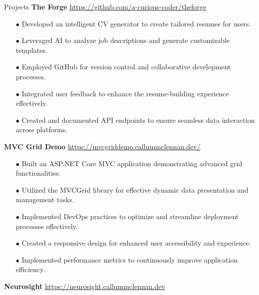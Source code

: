 \begin{rSection}{Projects}
\vspace{0.12cm}
{\bf The Forge}
\hspace{2 cm}{Python, AI, GitHub}
\hfill{\href{https://github.com/a-curious-coder/theforge}{https://github.com/a-curious-coder/theforge}}
\begin{itemize}[label=\myfancylabel, leftmargin=0.5cm, topsep=-5pt, itemsep=-1ex]
\setlength\itemsep{-0.25cm}
    \item[$\bullet$] Developed an intelligent CV generator to create tailored resumes for users.
    \item[$\bullet$] Leveraged AI to analyze job descriptions and generate customizable templates.
    \item[$\bullet$] Employed GitHub for version control and collaborative development processes.
    \item[$\bullet$] Integrated user feedback to enhance the resume-building experience effectively.
    \item[$\bullet$] Created and documented API endpoints to ensure seamless data interaction across platforms.
\end{itemize}
\vspace{0.12cm}
{\bf MVC Grid Demo}
\hspace{2 cm}{ASP.NET Core, MVC, GitHub}
\hfill{\href{https://mvcgriddemo.callummclennan.dev/}{https://mvcgriddemo.callummclennan.dev/}}
\begin{itemize}[label=\myfancylabel, leftmargin=0.5cm, topsep=-5pt, itemsep=-1ex]
\setlength\itemsep{-0.25cm}
    \item[$\bullet$] Built an ASP.NET Core MVC application demonstrating advanced grid functionalities.
    \item[$\bullet$] Utilized the MVCGrid library for effective dynamic data presentation and management tasks.
    \item[$\bullet$] Implemented DevOps practices to optimize and streamline deployment processes effectively.
    \item[$\bullet$] Created a responsive design for enhanced user accessibility and experience.
    \item[$\bullet$] Implemented performance metrics to continuously improve application efficiency.
\end{itemize}
\vspace{0.12cm}
{\bf Neurosight}
\hspace{2 cm}{Deep Learning, Python, Flask}
\hfill{\href{https://neurosight.callummclennan.dev}{https://neurosight.callummclennan.dev}}

\end{rSection}

